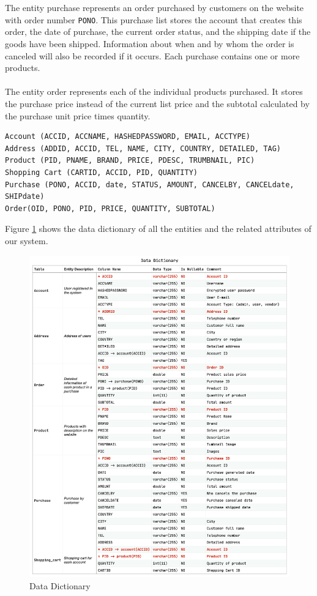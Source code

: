 \documentclass{article}
\begin{document}
\\\\
The entity purchase represents an order purchased by customers on the website with order number \verb|PONO|. This purchase list stores the account that creates this order, the date of purchase, the current order status, and the shipping date if the goods have been shipped. Information about when and by whom the order is canceled will also be recorded if it occurs. Each purchase contains one or more products.
\\\\
The entity order represents each of the individual products purchased. It stores the purchase price instead of the current list price and the subtotal calculated by the purchase unit price times quantity. 

\begin{verbatim}
Account (ACCID, ACCNAME, HASHEDPASSWORD, EMAIL, ACCTYPE)
Address (ADDID, ACCID, TEL, NAME, CITY, COUNTRY, DETAILED, TAG)
Product (PID, PNAME, BRAND, PRICE, PDESC, TRUMBNAIL, PIC)
Shopping Cart (CARTID, ACCID, PID, QUANTITY)
Purchase (PONO, ACCID, date, STATUS, AMOUNT, CANCELBY, CANCELdate, SHIPdate)
Order(OID, PONO, PID, PRICE, QUANTITY, SUBTOTAL)
\end{verbatim}

Figure \ref{fig:Data Dictionary} shows the data dictionary of all the entities and the related attributes of our system.
\begin{figure}[!htp]
    \centering
    \includegraphics[width=1\textwidth]{Data Dictionary.png}
    \caption{\label{fig:Data Dictionary}Data Dictionary}
\end{figure}
\end{document}
